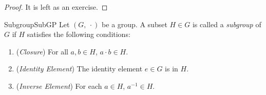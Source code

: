 \documentclass{article}
\begin{document}
\begin{proof}
It is left as an exercise.
\end{proof}

\begin{defn}{Subgroup}{SubGP}
    Let $(G,\ \cdot)$ be a group. A subset $H \in G$ is called a \emph{subgroup} of $G$ if $H$ satisfies the following conditions:
    \begin{enumerate}[label=(\roman*)]
        \item (\emph{Closure}) For all \( a, b \in H \), \( a \cdot b \in H \).
        \item (\emph{Identity Element}) The identity element \( e \in G \) is in \( H \).
        \item (\emph{Inverse Element}) For each \( a \in H \), \(a^{-1} \in H\).
    \end{enumerate} 
\end{defn}
\end{document}
